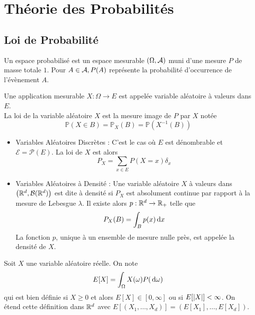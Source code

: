 \documentclass{cours}
\begin{document}
\section{Théorie des Probabilités}
\subsection{Loi de Probabilité}
\begin{definition}
    Un espace probabilisé est un espace mesurable $\left(\Omega, \mathcal{A}\right)$ muni d'une mesure $P$ de masse totale $1$. Pour $A\in \mathcal{A}, P(A)$ représente la probabilité d'occurrence de l'évènement $A$.
\end{definition}

\begin{definition}
    Une application mesurable $X : \Omega \rightarrow E$ est appelée variable aléatoire à valeurs dans $E$. \\
    La loi de la variable aléatoire $X$ est la mesure image de $P$ par $X$ notée
    \[
        \mathbb{P}(X\in B) = \mathbb{P}_{X}(B)= \mathbb{P}\left(X^{-1}(B)\right)
    \]
\end{definition}

\begin{definition}
    \begin{itemize}
        \item Variables Aléatoires Discrètes : C'est le cas où $E$ est dénombrable et $\mathcal{E} = \mathcal{P}(E)$. La loi de $X$ est alors \[P_{X} = \sum_{x \in E}P(X = x)\delta_{x}\]
        \item Variables Aléatoires à Densité : Une variable aléatoire $X$ à valeurs dans $\left(\mathbb{R}^{d}, \mathcal{B}(\mathbb{R}^{d})\right)$ est dite à densité si $P_{X}$ est absolument continue par rapport à la mesure de Lebesgue $\lambda$. Il existe alors $p : \mathbb{R}^{d} \rightarrow \mathbb{R}_{+}$ telle que \[P_{X}(B) = \int_{B}p(x){\rm \, d} x\] La fonction $p$, unique à un ensemble de mesure nulle près, est appelée la densité de $X$.
    \end{itemize}
\end{definition}

\begin{definition}
    Soit $X$ une variable aléatoire réelle. On note \[E[X] = \int_{\Omega}X(\omega)P({\rm \, d} \omega)\]
    qui est bien définie si $X \geq 0$ et alors $E[X] \in \left[0, \infty\right]$ ou si $E[\left|X\right|] < \infty$. On étend cette définition dans $\mathbb{R}^{d}$ avec $E\left[\left(X_{1}, \ldots, X_{d}\right)\right] = \left(E[X_{1}], \ldots, E[X_{d}]\right)$.
\end{definition}
\end{document}
